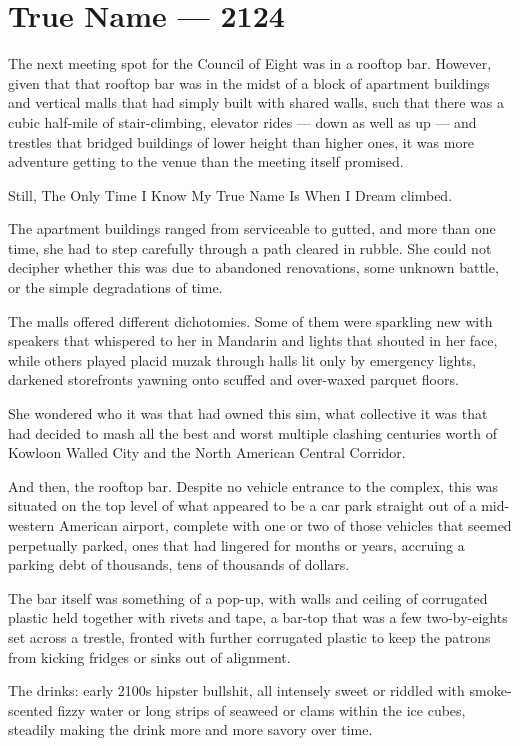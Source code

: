 \hypertarget{true-name-2124}{%
\chapter{True Name — 2124}\label{true-name-2124}}

The next meeting spot for the Council of Eight was in a rooftop bar. However, given that that rooftop bar was in the midst of a block of apartment buildings and vertical malls that had simply built with shared walls, such that there was a cubic half-mile of stair-climbing, elevator rides — down as well as up — and trestles that bridged buildings of lower height than higher ones, it was more adventure getting to the venue than the meeting itself promised.

Still, The Only Time I Know My True Name Is When I Dream climbed.

The apartment buildings ranged from serviceable to gutted, and more than one time, she had to step carefully through a path cleared in rubble. She could not decipher whether this was due to abandoned renovations, some unknown battle, or the simple degradations of time.

The malls offered different dichotomies. Some of them were sparkling new with speakers that whispered to her in Mandarin and lights that shouted in her face, while others played placid muzak through halls lit only by emergency lights, darkened storefronts yawning onto scuffed and over-waxed parquet floors.

She wondered who it was that had owned this sim, what collective it was that had decided to mash all the best and worst multiple clashing centuries worth of Kowloon Walled City and the North American Central Corridor.

And then, the rooftop bar. Despite no vehicle entrance to the complex, this was situated on the top level of what appeared to be a car park straight out of a mid-western American airport, complete with one or two of those vehicles that seemed perpetually parked, ones that had lingered for months or years, accruing a parking debt of thousands, tens of thousands of dollars.

The bar itself was something of a pop-up, with walls and ceiling of corrugated plastic held together with rivets and tape, a bar-top that was a few two-by-eights set across a trestle, fronted with further corrugated plastic to keep the patrons from kicking fridges or sinks out of alignment.

The drinks: early 2100s hipster bullshit, all intensely sweet or riddled with smoke-scented fizzy water or long strips of seaweed or clams within the ice cubes, steadily making the drink more and more savory over time.

